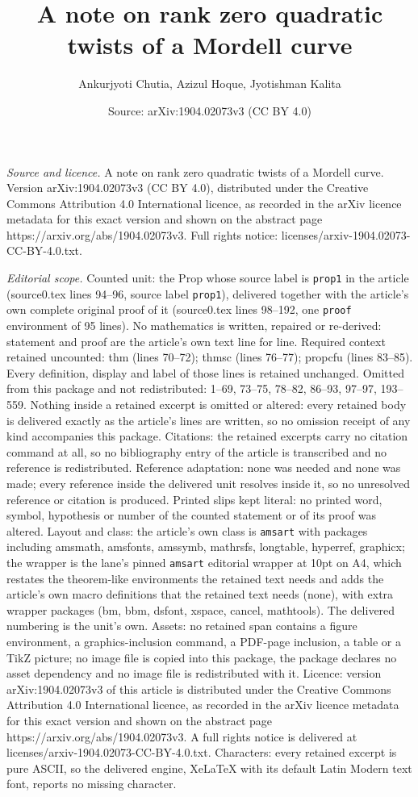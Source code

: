 \documentclass[10pt,a4paper]{amsart}
\title[A note on rank zero quadratic twists of a Mordell curve]{A note on rank zero quadratic twists of a Mordell curve}
\author{Ankurjyoti Chutia, Azizul Hoque, Jyotishman Kalita}
\date{Source: arXiv:1904.02073v3 (CC BY 4.0)}
\begin{document}
\maketitle

\noindent\emph{Source and licence.} A note on rank zero quadratic twists of a Mordell curve. Version arXiv:1904.02073v3 (CC BY 4.0), distributed under the Creative Commons Attribution 4.0 International licence, as recorded in the arXiv licence metadata for this exact version and shown on the abstract page https://arxiv.org/abs/1904.02073v3. Full rights notice: licenses/arxiv-1904.02073-CC-BY-4.0.txt.\par\smallskip

\noindent\textit{Editorial scope.} Counted unit: the Prop whose source label is \texttt{prop1} in the article (source0.tex lines 94--96, source label \texttt{prop1}), delivered together with the article's own complete original proof of it (source0.tex lines 98--192, one \texttt{proof} environment of 95 lines). No mathematics is written, repaired or re-derived: statement and proof are the article's own text line for line. Required context retained uncounted: thm (lines 70--72); thmsc (lines 76--77); propcfu (lines 83--85). Every definition, display and label of those lines is retained unchanged. Omitted from this package and not redistributed: 1--69, 73--75, 78--82, 86--93, 97--97, 193--559. Nothing inside a retained excerpt is omitted or altered: every retained body is delivered exactly as the article's lines are written, so no omission receipt of any kind accompanies this package. Citations: the retained excerpts carry no citation command at all, so no bibliography entry of the article is transcribed and no reference is redistributed. Reference adaptation: none was needed and none was made; every reference inside the delivered unit resolves inside it, so no unresolved reference or citation is produced. Printed slips kept literal: no printed word, symbol, hypothesis or number of the counted statement or of its proof was altered. Layout and class: the article's own class is \texttt{amsart} with packages including amsmath, amsfonts, amssymb, mathrsfs, longtable, hyperref, graphicx; the wrapper is the lane's pinned \texttt{amsart} editorial wrapper at 10pt on A4, which restates the theorem-like environments the retained text needs and adds the article's own macro definitions that the retained text needs (none), with extra wrapper packages (bm, bbm, dsfont, xspace, cancel, mathtools). The delivered numbering is the unit's own. Assets: no retained span contains a figure environment, a graphics-inclusion command, a PDF-page inclusion, a table or a TikZ picture; no image file is copied into this package, the package declares no asset dependency and no image file is redistributed with it. Licence: version arXiv:1904.02073v3 of this article is distributed under the Creative Commons Attribution 4.0 International licence, as recorded in the arXiv licence metadata for this exact version and shown on the abstract page https://arxiv.org/abs/1904.02073v3. A full rights notice is delivered at licenses/arxiv-1904.02073-CC-BY-4.0.txt. Characters: every retained excerpt is pure ASCII, so the delivered engine, XeLaTeX with its default Latin Modern text font, reports no missing character.
\end{document}
